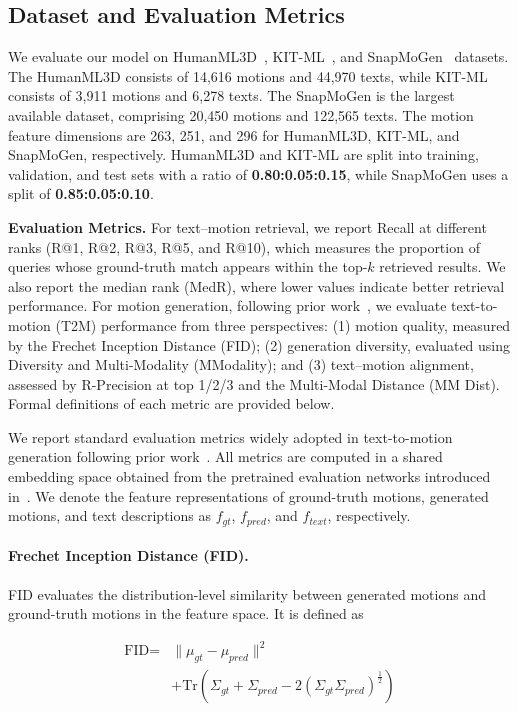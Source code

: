 \documentclass[10pt,journal,compsoc]{IEEEtran}
\newcommand{\myparagraph}[1]{\textbf{#1}\hspace{1.8ex}}
\begin{document}
\subsection{Dataset and Evaluation Metrics}
We evaluate our model on HumanML3D~\cite{humanml3d}, KIT-ML~\cite{kitml}, and SnapMoGen~\cite{momask2} datasets. The HumanML3D consists of 14,616 motions and 44,970 texts, while KIT-ML consists of 3,911 motions and 6,278 texts. The SnapMoGen is the largest available dataset, comprising 20,450 motions and 122,565 texts. The motion feature dimensions are 263, 251, and 296 for HumanML3D, KIT-ML, and SnapMoGen, respectively. HumanML3D and KIT-ML are split into training, validation, and test sets with a ratio of \textbf{0.80:0.05:0.15}, while SnapMoGen uses a split of \textbf{0.85:0.05:0.10}.

\noindent \myparagraph{Evaluation Metrics.}
For text–motion retrieval, we report Recall at different ranks (R@1, R@2, R@3, R@5, and R@10), which measures the proportion of queries whose ground-truth match appears within the top-$k$ retrieved results. We also report the median rank (MedR), where lower values indicate better retrieval performance.
For motion generation, following prior work~\cite{momask,mogents}, we evaluate text-to-motion (T2M) performance from three perspectives: (1) motion quality, measured by the Frechet Inception Distance (FID); (2) generation diversity, evaluated using Diversity and Multi-Modality (MModality); and (3) text–motion alignment, assessed by R-Precision at top 1/2/3 and the Multi-Modal Distance (MM Dist). 
Formal definitions of each metric are provided below.

We report standard evaluation metrics widely adopted in text-to-motion generation following prior work~\cite{humanml3d}. All metrics are computed in a shared embedding space obtained from the pretrained evaluation networks introduced in~\cite{humanml3d}. We denote the feature representations of ground-truth motions, generated motions, and text descriptions as $f_{gt}$, $f_{pred}$, and $f_{text}$, respectively.

\paragraph{Frechet Inception Distance (FID).}
FID evaluates the distribution-level similarity between generated motions and ground-truth motions in the feature space. It is defined as

\begin{equation}
\begin{aligned}
\text{FID} = {} & \lVert \mu_{gt} - \mu_{pred} \rVert^2 \\
& + \mathrm{Tr}\!\left(
\Sigma_{gt} + \Sigma_{pred}
- 2(\Sigma_{gt}\Sigma_{pred})^{\frac{1}{2}}
\right)
\end{aligned}
\label{formula:fid}
\end{equation}
\end{document}
